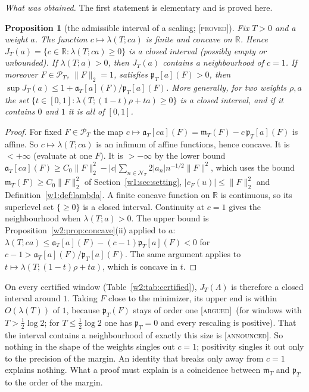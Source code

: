 \documentclass[11pt]{amsart}
\newtheorem{proposition}[theorem]{Proposition}
\theoremstyle{definition}
\theoremstyle{remark}
\numberwithin{equation}{section}
\newcommand{\R}{\mathbb{R}}
\newcommand{\cF}{c_F}                                  %
\newcommand{\PT}{\mathcal{P}_T}                        %
\newcommand{\NT}{\mathcal{N}_T}                        %
\newcommand{\mT}{\mathfrak{m}_T}                       %
\newcommand{\pT}{\mathfrak{p}_T}                       %
\newcommand{\aT}{\mathfrak{a}_T}                       %
\newcommand{\lam}{\lambda(T)}                          %
\newcommand{\stag}[1]{\textsc{[#1]}}
\newcommand{\PROVED}{\stag{proved}}
\newcommand{\ARGUED}{\stag{argued}}
\newcommand{\ANNOUNCED}{\stag{announced}}
\newcommand{\entry}[1]{\par\smallskip\noindent\textit{#1.}\enspace}
\begin{document}
\entry{What was obtained} The first statement is elementary and is proved here.

\begin{proposition}[the admissible interval of a scaling; \PROVED]\label{w8:prop:scaling}
Fix $T>0$ and a weight $a$. The function $c\mapsto\lambda(T;ca)$ is finite and concave on $\R$. Hence
$J_T(a)=\{c\in\R:\lambda(T;ca)\ge0\}$ is a closed interval (possibly empty or unbounded). If $\lambda(T;a)>0$, then
$J_T(a)$ contains a neighbourhood of $c=1$. If moreover $F\in\PT$, $\|F\|_2=1$, satisfies $\pT[a](F)>0$, then
$\sup J_T(a)\le 1+\aT[a](F)/\pT[a](F)$. More generally, for two weights $\rho,a$ the set
$\{t\in[0,1]:\lambda(T;(1-t)\rho+ta)\ge0\}$ is a closed interval, and if it contains $0$ and $1$ it is all of $[0,1]$.
\end{proposition}

\begin{proof}
For fixed $F\in\PT$ the map $c\mapsto\aT[ca](F)=\mT(F)-c\,\pT[a](F)$ is affine. So $c\mapsto\lambda(T;ca)$ is an
infimum of affine functions, hence concave. It is $<+\infty$ (evaluate at one $F$). It is $>-\infty$ by the lower bound
$\aT[ca](F)\ge C_0\|F\|_2^2-|c|\sum_{n\in\NT}2|a_n|n^{-1/2}\|F\|^2$, which uses the bound $\mT(F)\ge C_0\|F\|_2^2$ of Section~\ref{w1:sec:setting}, $|\cF(u)|\le\|F\|_2^2$ and
Definition~\ref{w1:def:lambda}. A finite concave function on $\R$ is continuous, so its superlevel set $\{\ge0\}$ is a
closed interval. Continuity at $c=1$ gives the neighbourhood when $\lambda(T;a)>0$. The upper bound is
Proposition~\ref{w2:prop:concave}(ii) applied to $a$:
$\lambda(T;ca)\le\aT[a](F)-(c-1)\pT[a](F)<0$ for $c-1>\aT[a](F)/\pT[a](F)$. The same argument applies to
$t\mapsto\lambda(T;(1-t)\rho+ta)$, which is concave in $t$.
\end{proof}

On every certified window (Table~\ref{w2:tab:certified}), $J_T(\Lambda)$ is therefore a closed interval around $1$.
Taking $F$ close to the minimizer, its upper end is within $O(\lam)$ of $1$, because $\pT(F)$ stays of order one \ARGUED\ (for windows with $T>\frac12\log2$; for $T\le\frac12\log2$ one has $\pT=0$ and every rescaling is positive).
That the interval contains a neighbourhood of exactly this size is \ANNOUNCED. So nothing in the shape of the weights singles out $c=1$; positivity singles it out only to the
precision of the margin. An identity that breaks only away from $c=1$ explains nothing. What a proof must explain is a
coincidence between $\mT$ and $\pT$ to the order of the margin.
\end{document}

